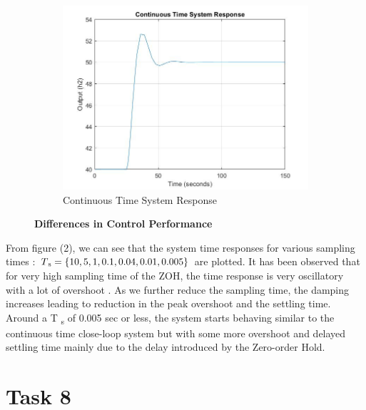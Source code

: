 \documentclass[a4paper,12pt,oneside,onecolumn]{article} %
\begin{document}
\begin{figure}[H]
\begin{subfigure}{0.4\textwidth}
 \includegraphics[width = \textwidth]{system_response}
\caption{Continuous Time System Response}
\end{subfigure}
\caption{\textbf{Differences in Control Performance}}
\end{figure}  

From figure (2), we can see that the system time responses for various sampling times : $T \textsubscript{s} = \{10, 5, 1, 0.1, 0.04, 0.01, 0.005\}$ are plotted. 
It has been observed that for very high sampling time of the ZOH, the time response is very oscillatory with a lot of overshoot . As we further reduce the sampling time, the damping increases leading to reduction in the peak overshoot and the settling time. Around a T \textsubscript{s} of 0.005 sec or less, the system starts behaving similar to the continuous time close-loop system but with some more overshoot and delayed settling time mainly due to the delay introduced by the Zero-order Hold.

\section*{Task 8}
\end{document}
